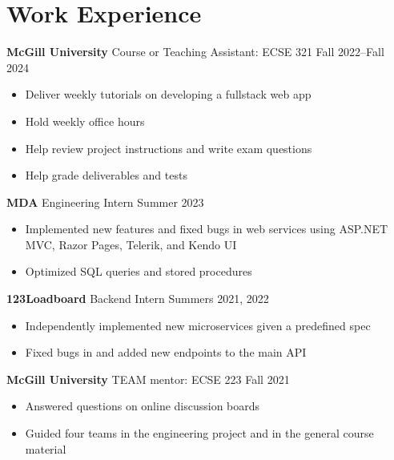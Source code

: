 \documentclass[12pt]{article}
\begin{document}
\section*{Work Experience}

\textbf{McGill University} Course or Teaching Assistant: ECSE 321
\hfill
Fall 2022--Fall 2024
\begin{itemize}
	\item Deliver weekly tutorials on developing a fullstack web app
	\item Hold weekly office hours
	\item Help review project instructions and write exam questions
	\item Help grade deliverables and tests
\end{itemize}

\textbf{MDA} Engineering Intern
\hfill
Summer 2023
\begin{itemize}
	\item Implemented new features and fixed bugs in web services using ASP.NET MVC, Razor Pages, Telerik, and Kendo UI
	\item Optimized SQL queries and stored procedures
\end{itemize}

\textbf{123Loadboard} Backend Intern
\hfill
Summers 2021, 2022
\begin{itemize}
	\item Independently implemented new microservices given a predefined spec
	\item Fixed bugs in and added new endpoints to the main API
\end{itemize}

\textbf{McGill University} TEAM mentor: ECSE 223
\hfill
Fall 2021
\begin{itemize}
	\item Answered questions on online discussion boards
	\item Guided four teams in the engineering project and in the general course material
\end{itemize}
\end{document}
